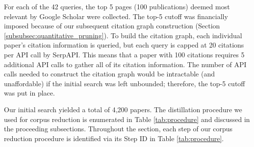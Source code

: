 \documentclass[manuscript,screen,review]{acmart}
\begin{document}
For each of the 42 queries, the top 5 pages (100 publications) deemed most relevant by Google Scholar were collected. The top-5 cutoff was financially imposed because of our subsequent citation graph construction (Section \ref{subsubsec:quantitative_pruning}). To build the citation graph, each individual paper's citation information is queried, but each query is capped at 20 citations per API call by SerpAPI. This means that a paper with 100 citations requires 5 additional API calls to gather all of its citation information. The number of API calls needed to construct the citation graph would be intractable (and unaffordable) if the initial search was left unbounded; therefore, the top-5 cutoff was put in place.

Our initial search yielded a total of 4,200 papers. The distillation procedure we used for corpus reduction is enumerated in Table \ref{tab:procedure} and discussed in the proceeding subsections. Throughout the section, each step of our corpus reduction procedure is identified via its Step ID in Table \ref{tab:procedure}.
\end{document}

